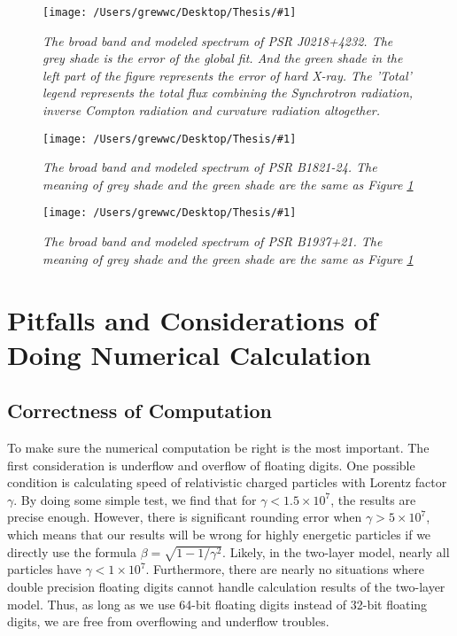 \documentclass[12pt]{report}
\newcommand{\mycaption}[1]{\caption{\textit{\footnotesize #1}}}
\newcommand{\singleFig}[3]{
 \begin{figure}[!ht]
  \centering
  \texttt{[image: /Users/grewwc/Desktop/Thesis/\#1]}
  \mycaption{#3}
 \label{fig: #1}
 \end{figure}
}
\begin{document}
        \singleFig{j0218_twolayer_all.png}{0.39}{The broad band and modeled spectrum of PSR J0218+4232.
          The grey shade is the error of the global fit. And the green shade in the left part of the 
          figure represents the error of hard X-ray. The 'Total' legend represents the total flux 
          combining the Synchrotron radiation, inverse Compton radiation and curvature radiation
          altogether.}
        \vspace{0.5cm} 
        
        \singleFig{b1821_twolayer_all.png}{0.4}{The broad band and modeled spectrum of PSR B1821-24.
          The meaning of grey shade and the green shade are the same as Figure
          \ref{fig: j0218_twolayer_all.png}}
        \vspace{0.5cm} 
          
        \singleFig{j1939_twolayer_all.png}{0.39}{The broad band and modeled spectrum of PSR B1937+21.
          The meaning of grey shade and the green shade are the same as Figure
          \ref{fig: j0218_twolayer_all.png}}
        \vspace{0.5cm}
        
      \section{Pitfalls and Considerations of Doing Numerical Calculation}
        \subsection{Correctness of Computation}
          To make sure the numerical computation be right is the most important. 
          The first consideration is underflow and overflow of floating digits.
          One possible condition is calculating speed of relativistic charged particles with 
          Lorentz factor $\gamma$. By doing some simple test, we find that for 
          $\gamma < 1.5\times 10^7$, the results are precise enough. However, there is significant rounding error
          when $\gamma > 5\times 10^7$, which means that our results will be wrong for highly 
          energetic particles if we directly use the formula $\beta = \sqrt{1 - 1/\gamma^2}$.
          Likely, in the two-layer model, nearly all particles have $\gamma < 1\times 10^7$. 
          Furthermore, there are nearly no situations where double precision floating digits
          cannot handle calculation results of the two-layer model. Thus, as long as we use 
          64-bit floating digits instead of 32-bit floating digits, we are free from overflowing and 
          underflow troubles. 
            
\end{document}

